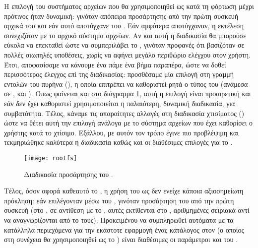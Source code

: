 Η επιλογή του συστήματος αρχείων που θα χρησιμοποιηθεί ως  κατά τη
φόρτωση μέχρι πρότινος ήταν δυναμική: γινόταν απόπειρα προσάρτησης από την
πρώτη συσκευή  αρχικά του  και εάν αυτό αποτύγχανε του
. Εάν αμφότερα αποτύγχαναν, η εκτέλεση συνεχιζόταν με το 
αρχικό σύστημα αρχείων.
Αν και αυτή η διαδικασία θα μπορούσε εύκολα να επεκταθεί ώστε να συμπεριλάβει το
\viofs{}, γινόταν προφανές ότι βασιζόταν σε πολλές σιωπηλές υποθέσεις, χωρίς να
αφήνει μεγάλο περιθώριο ελέγχου στον χρήστη. Έτσι, αποφασίσαμε να κάνουμε ένα
πάμε ένα βήμα παραπέρα, ώστε να δοθεί περισσότερος έλεγχος επί της διαδικασίας:
προσθέσαμε μία επιλογή \texttt{} στη γραμμή εντολών του πυρήνα
(), η οποία επιτρέπει να καθοριστεί ρητά ο τύπος του
 (ανάμεσα σε , \viofs{} και ). Όπως
φαίνεται και στο διάγραμμα \ref{fig:rootfs}, αυτή η επιλογή είναι προαιρετική
και εάν δεν έχει καθοριστεί χρησιμοποιείται η παλαιότερη, δυναμική διαδικασία,
για συμβατότητα. Τέλος, κάναμε τις απαραίτητες αλλαγές στη διαδικασία χτισίματος
() ώστε να θέτει αυτή την επιλογή ανάλογα με το σύστημα
αρχείων που έχει καθορίσει ο χρήστης κατά το χτίσιμο. Εξάλλου, με αυτόν τον
τρόπο έγινε πιο προβλέψιμη και τεκμηριώθηκε καλύτερα η διαδικασία καθώς και οι
διαθέσιμες επιλογές για το .

\begin{figure}
    \centering
    \texttt{[image: rootfs]}
    \caption{Διαδικασία προσάρτησης του .}
    \label{fig:rootfs}
\end{figure}

Τέλος, όσον αφορά καθεαυτό το \viofs{}, η χρήση του ως 
δεν ενείχε κάποια αξιοσημείωτη πρόκληση: εάν επιλέγονταν μέσω του
\texttt{}, γινόταν προσάρτηση του από την πρώτη \viofs{} συσκευή
(στο \osv{}, σε αντίθεση με το , αυτές εκτίθενται στο ,
αριθμημένες σειριακά αντί να αναγνωρίζονται από το \viofs{}  τους).
Προκειμένου να συμπληρωθεί αυτόματα με τα κατάλληλα περιεχόμενα για την εκάστοτε
εφαρμογή ένας κατάλογος στον \host{} (ο οποίος στη συνέχεια θα χρησιμοποιηθεί
ως το \viofs{} ) είναι διαθέσιμες οι παράμετροι
\texttt{} και \texttt{} του .
